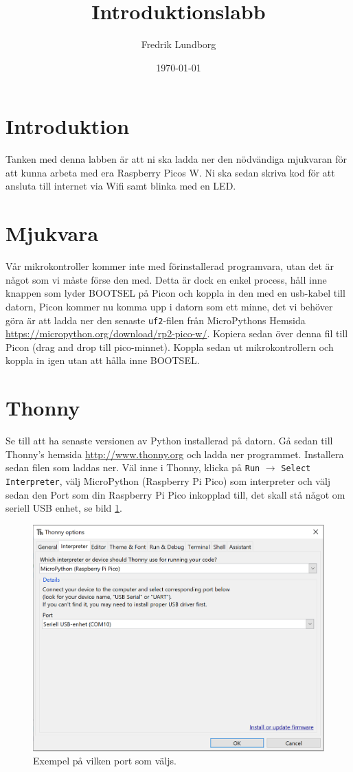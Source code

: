 \documentclass{article}
\title{Introduktionslabb}
\author{Fredrik Lundborg}
\date{\today}
\begin{document}
\maketitle

\section*{Introduktion}
Tanken med denna labben är att ni ska ladda ner den nödvändiga mjukvaran för att kunna arbeta med era Raspberry Picos W. Ni ska sedan skriva kod för att ansluta till internet via Wifi samt blinka med en LED.

\section*{Mjukvara}
Vår mikrokontroller kommer inte med förinstallerad programvara, utan det är något som vi måste förse den med. Detta är dock en enkel process, håll inne knappen som lyder BOOTSEL på Picon och koppla in den med en usb-kabel till datorn, Picon kommer nu komma upp i datorn som ett minne, det vi behöver göra är att ladda ner den senaste \texttt{uf2}-filen från MicroPythons Hemsida \url{https://micropython.org/download/rp2-pico-w/}. Kopiera sedan över denna fil till Picon (drag and drop till pico-minnet). Koppla sedan ut mikrokontrollern och koppla in igen utan att hålla inne BOOTSEL.

\section*{Thonny}
Se till att ha senaste versionen av Python installerad på datorn. Gå sedan till Thonny's hemsida \url{http://www.thonny.org} och ladda ner programmet. Installera sedan filen som laddas ner. Väl inne i Thonny, klicka på \texttt{Run} $\rightarrow$ \texttt{Select Interpreter}, välj MicroPython (Raspberry Pi Pico) som interpreter och välj sedan den Port som din Raspberry Pi Pico inkopplad till, det skall stå något om seriell USB enhet, se bild \ref{fig:thonny}.

\begin{figure}[H]
    \centering
    \includegraphics[scale = 0.7]{thonny.png}
    \caption{Exempel på vilken port som väljs.}
    \label{fig:thonny}
\end{figure}
\end{document}
